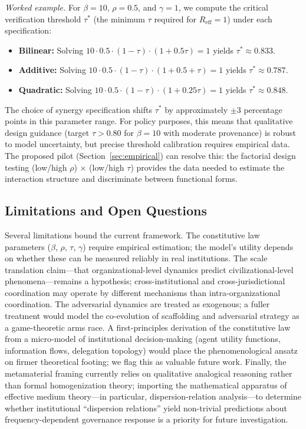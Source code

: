 \documentclass[runningheads]{llncs}
\begin{document}
\emph{Worked example.} For $\beta = 10$, $\rho = 0.5$, and $\gamma = 1$, we compute the critical verification threshold $\tau^*$ (the minimum $\tau$ required for $R_{\mathrm{eff}} = 1$) under each specification:
\begin{itemize}
\item \textbf{Bilinear:} Solving $10 \cdot 0.5 \cdot (1-\tau) \cdot (1 + 0.5\tau) = 1$ yields $\tau^* \approx 0.833$.
\item \textbf{Additive:} Solving $10 \cdot 0.5 \cdot (1-\tau) \cdot (1 + 0.5 + \tau) = 1$ yields $\tau^* \approx 0.787$.
\item \textbf{Quadratic:} Solving $10 \cdot 0.5 \cdot (1-\tau) \cdot (1 + 0.25\tau) = 1$ yields $\tau^* \approx 0.848$.
\end{itemize}
The choice of synergy specification shifts $\tau^*$ by approximately $\pm 3$ percentage points in this parameter range. For policy purposes, this means that qualitative design guidance (target $\tau > 0.80$ for $\beta = 10$ with moderate provenance) is robust to model uncertainty, but precise threshold calibration requires empirical data. The proposed pilot (Section~\ref{sec:empirical}) can resolve this: the factorial design testing (low/high $\rho$) $\times$ (low/high $\tau$) provides the data needed to estimate the interaction structure and discriminate between functional forms.

\subsection{Limitations and Open Questions}

Several limitations bound the current framework. The constitutive law parameters ($\beta$, $\rho$, $\tau$, $\gamma$) require empirical estimation; the model's utility depends on whether these can be measured reliably in real institutions. The scale translation claim---that organizational-level dynamics predict civilizational-level phenomena---remains a hypothesis; cross-institutional and cross-jurisdictional coordination may operate by different mechanisms than intra-organizational coordination. The adversarial dynamics are treated as exogenous; a fuller treatment would model the co-evolution of scaffolding and adversarial strategy as a game-theoretic arms race. A first-principles derivation of the constitutive law from a micro-model of institutional decision-making (agent utility functions, information flows, delegation topology) would place the phenomenological ansatz on firmer theoretical footing; we flag this as valuable future work. Finally, the metamaterial framing currently relies on qualitative analogical reasoning rather than formal homogenization theory; importing the mathematical apparatus of effective medium theory---in particular, dispersion-relation analysis---to determine whether institutional ``dispersion relations'' yield non-trivial predictions about frequency-dependent governance response is a priority for future investigation.
\end{document}
